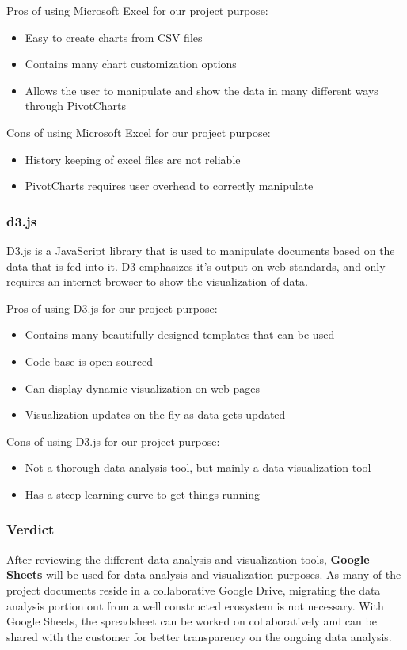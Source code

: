 \documentclass[10pt,journal,compsoc,draftclsnofoot]{IEEEtran}
\begin{document}
Pros of using Microsoft Excel for our project purpose:
\begin{itemize}
\item Easy to create charts from CSV files
\item Contains many chart customization options
\item Allows the user to manipulate and show the data in many different ways through PivotCharts
\end{itemize}

Cons of using Microsoft Excel for our project purpose:
\begin{itemize}
\item History keeping of excel files are not reliable
\item PivotCharts requires user overhead to correctly manipulate
\end{itemize}

\subsubsection{d3.js}
D3.js is a JavaScript library that is used to manipulate documents based on the data that is fed into it.
D3 emphasizes it's output on web standards, and only requires an internet browser to show the visualization of data.

Pros of using D3.js for our project purpose:
\begin{itemize}
\item Contains many beautifully designed templates that can be used
\item Code base is open sourced
\item Can display dynamic visualization on web pages
\item Visualization updates on the fly as data gets updated
\end{itemize}

Cons of using D3.js for our project purpose:
\begin{itemize}
\item Not a thorough data analysis tool, but mainly a data visualization tool
\item Has a steep learning curve to get things running
\end{itemize}

\subsubsection{Verdict}
After reviewing the different data analysis and visualization tools, \textbf{Google Sheets} will be used for data analysis and visualization purposes.
As many of the project documents reside in a collaborative Google Drive, migrating the data analysis portion out from a well constructed ecosystem is not necessary.
With Google Sheets, the spreadsheet can be worked on collaboratively and can be shared with the customer for better transparency on the ongoing data analysis. 
\end{document}
